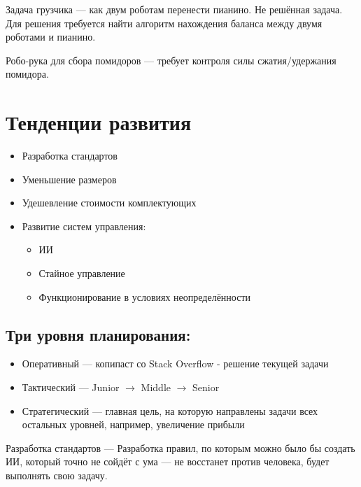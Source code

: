 \documentclass[12pt]{article}
\begin{document}
\begin{sloppypar}
    Задача грузчика — как двум роботам перенести пианино. Не решённая задача.
    Для решения требуется найти алгоритм нахождения баланса между двумя роботами
    и пианино.

    Робо-рука для сбора помидоров — требует контроля силы сжатия/удержания
    помидора.

    \section{Тенденции развития}
    \begin{itemize}
        \item Разработка стандартов
        \item Уменьшение размеров
        \item Удешевление стоимости комплектующих
        \item Развитие систем управления:
              \begin{itemize}
                  \item ИИ
                  \item Стайное управление
                  \item Функционирование в условиях неопределённости
              \end{itemize}
    \end{itemize}
    \subsection*{Три уровня планирования:}
    \begin{itemize}
        \item Оперативный — копипаст со Stack Overflow - решение текущей задачи
        \item Тактический — Junior $\rightarrow$ Middle $\rightarrow$ Senior
        \item Стратегический — главная цель, на которую направлены задачи всех
              остальных уровней, например, увеличение прибыли
    \end{itemize}

    Разработка стандартов — Разработка правил, по которым можно было бы создать
    ИИ, который точно не сойдёт с ума — не восстанет против человека, будет
    выполнять свою задачу.


\end{sloppypar}
\end{document}
